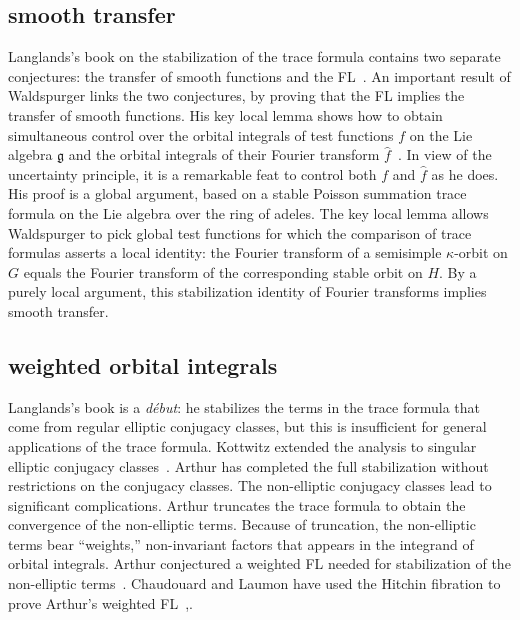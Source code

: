 \documentclass[brochure,english,12pt]{bourbaki}
\theoremstyle{plain}
\def\g{\mathfrak{g}}
\begin{document}
\subsection{smooth transfer}

Langlands's book on the stabilization of the trace formula contains
two separate conjectures:  the transfer of smooth
functions  and the FL~\cite{Langlands:debuts}.  An important result
of Waldspurger links the two conjectures, by proving that the
FL implies the transfer of smooth functions.  
His key local lemma shows how to obtain simultaneous control over the
orbital integrals of test functions $f$ on the Lie algebra $\g$ and the orbital integrals of
their Fourier transform $\hat f$~\cite[Prop.~8.2]{Wald:transfert}.  
In view of the uncertainty principle, it is a remarkable feat to
control both $f$ and $\hat f$ as he does.
His proof is a global argument, based on a stable Poisson summation
trace formula on the Lie algebra over the ring of adeles.  The key local lemma allows
Waldspurger to pick global test functions for which the comparison of
trace formulas asserts a local identity: the Fourier transform of a
semisimple $\kappa$-orbit on $G$ equals the Fourier transform of the
corresponding stable orbit on $H$.  By a purely local argument, this
stabilization identity of Fourier transforms  implies smooth transfer.


\subsection{weighted orbital integrals}

Langlands's book is a {\it d\'ebut}: he
stabilizes the terms in the trace formula that come from regular
elliptic conjugacy classes, but  this is insufficient for general
applications of the trace formula.  Kottwitz extended the analysis to
singular elliptic conjugacy classes~\cite{Kott:singular}.  Arthur has
completed the full stabilization without restrictions on the conjugacy
classes.  The non-elliptic conjugacy classes lead to significant
complications.  Arthur truncates the trace formula to obtain the
convergence of the non-elliptic terms.  Because of truncation, the
non-elliptic terms bear ``weights,'' non-invariant factors that
appears in the integrand of orbital integrals.  Arthur conjectured a
weighted FL needed for stabilization of the non-elliptic
terms~\cite{Arthur:2002}.  Chaudouard and Laumon have used the Hitchin
fibration to prove Arthur's weighted
FL~\cite{CL:2009:I},\cite{CL:2009:II}.  
\end{document}
